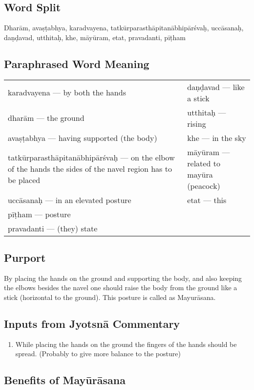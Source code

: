 \subsection*{Word Split}

Dharām, avaṣṭabhya, karadvayena, tatkūrparasthāpitanābhipārśvaḥ, uccāsanaḥ, daṇḍavad, utthitaḥ, khe, māyūram, etat, pravadanti, pīṭham

\subsection*{Paraphrased Word Meaning}

\begin{longtable}{>{\noindent\raggedright}p{5cm}>{\noindent\raggedright}p{5cm}}
karadvayena --- by both the hands &  daṇḍavad --- like  a stick\tabularnewline
dharām --- the ground  & utthitaḥ --- rising\tabularnewline
avaṣṭabhya --- having supported (the body) & khe --- in the sky\tabularnewline
tatkūrparasthāpitanābhipārśvaḥ --- on the elbow of the hands the sides of the navel  region has to be placed & māyūram --- related to  mayūra (peacock)\tabularnewline
uccāsanaḥ --- in an elevated posture & etat --- this\tabularnewline
pīṭham --- posture  & \tabularnewline
pravadanti --- (they) state & 
\end{longtable}

\subsection*{Purport}

By placing the hands on the ground and supporting the body, and also keeping the elbows besides the navel one should raise the body from the ground like a stick (horizontal to the ground). This posture is called as Mayurāsana.

\subsection*{Inputs from Jyotsnā Commentary}

\begin{enumerate}
\item While placing the hands on the ground the fingers of the hands should be spread. (Probably to give more balance to the posture) 
\end{enumerate}

\subsection*{Benefits of Mayūrāsana}


